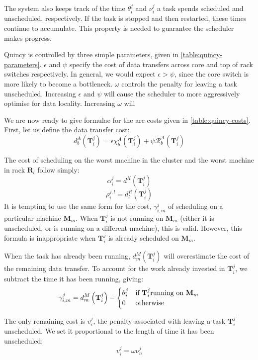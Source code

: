 The system also keeps track of the time $\theta_i^j$ and $\nu_i^j$ a task spends scheduled and unscheduled, respectively. If the task is stopped and then restarted, these times continue to accumulate. This property is needed to guarantee the scheduler makes progress.

Quincy is controlled by three simple parameters, given in \cref{table:quincy-parameters}. $\epsilon$ and $\psi$ specify the cost of data transfers across core and top of rack switches respectively. In general, we would expect $\epsilon > \psi$, since the core switch is more likely to become a bottleneck. $\omega$ controls the penalty for leaving a task unscheduled\footnotemark. Increasing $\epsilon$ and $\psi$ will cause the scheduler to more aggressively optimise for data locality. Increasing $\omega$ will 

We are now ready to give formulae for the arc costs given in \cref{table:quincy-costs}. First, let us define the data transfer cost:
\[d_{b}^{A}\left(\mathbf{T}_{i}^{j}\right) = \epsilon\chi_{b}^{A}\left(\mathbf{T}_{i}^{j}\right)+\psi\mathcal{R}_{b}^{A}\left(\mathbf{T}_{i}^{j}\right)\]

The cost of scheduling on the worst machine in the cluster and the worst machine in rack $\mathbf{R}_l$ follow simply:
\[\alpha_{i}^{j} = d^X\left(\mathbf{T}_{i}^{j}\right)\]
\[\rho_{i}^{j,l} = d^R_l\left(\mathbf{T}_{i}^{j}\right)\]
It is tempting to use the same form for the cost, $\gamma^j_{i,m}$ of scheduling on a particular machine $\mathbf{M}_m$. When $\mathbf{T}_{i}^{j}$ is not running on $\mathbf{M}_m$ (either it is unscheduled, or is running on a different machine), this is valid. However, this formula is inappropriate when $\mathbf{T}_{i}^{j}$ is already scheduled on  $\mathbf{M}_m$.

When the task has already been running, $d^M_m\left(\mathbf{T}_{i}^{j}\right)$ will overestimate the cost of the remaining data transfer. To account for the work already invested in $\mathbf{T}_{i}^{j}$, we subtract the time it has been running, giving:
\[\gamma_{i,m}^{j} = d_{m}^{M}\left(\mathbf{T}_{i}^{j}\right)-\begin{cases}
\theta_{i}^{j} & \text{if \ensuremath{\mathbf{T}_{i}^{j}}running on \ensuremath{\mathbf{M}_{m}}}\\
0 & \text{otherwise}
\end{cases}\]

The only remaining cost is $v_i^j$, the penalty associated with leaving a task $\mathbf{T}_{i}^{j}$ unscheduled. We set it proportional to the length of time it has been unscheduled:
\[v_i^j = \omega\nu_{n}^{j}\]


